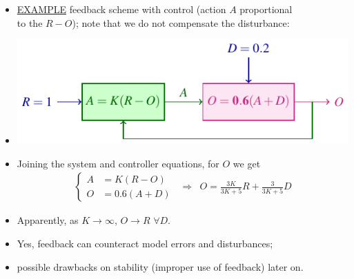 \begin{frame}
\myPause
 \begin{itemize}[<+-| alert@+>]
 \item \underline{EXAMPLE} feedback scheme with  control (action $A$ proportional\\
       to the  $R-O$); note that we do not compensate the disturbance:
 \item[] \begin{center}
          \includegraphics[width=0.60\columnwidth]{./Unit-02/img/Taxonomy-ClosedLoop-Example.pdf}
         \end{center}
 \item Joining the system and controller equations, for $O$ we get
       \begin{displaymath}
        \begin{array}{rcl}
         \left\{\begin{array}{rl}
          A &= K(R-O) \\
          O &= 0.6(A+D)
         \end{array}\right. &
         \Rightarrow &
          O = \frac{3K}{3K+5}R+\frac{3}{3K+5}D
         \end{array}
        \end{displaymath}
 \item Apparently, as $K \rightarrow \infty$, $O \rightarrow R$ $\forall D$.
 \item \vfill Yes, feedback can counteract model errors and disturbances;
 \item possible drawbacks on stability (improper use of feedback) later on. 
 \end{itemize}
\end{frame}

